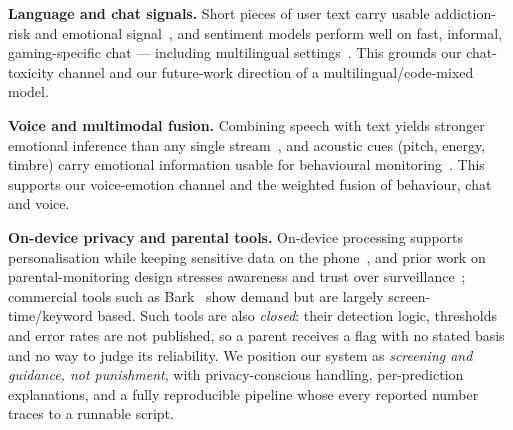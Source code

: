 \documentclass[11pt,a4paper]{article}
\begin{document}
\textbf{Language and chat signals.} Short pieces of user text carry usable
addiction-risk and emotional signal~\cite{strojny2024}, and sentiment models perform
well on fast, informal, gaming-specific chat --- including multilingual
settings~\cite{kina2024}. This grounds our chat-toxicity channel and our future-work
direction of a multilingual/code-mixed model.

\textbf{Voice and multimodal fusion.} Combining speech with text yields stronger
emotional inference than any single stream~\cite{tyagi2024}, and acoustic cues (pitch,
energy, timbre) carry emotional information usable for behavioural
monitoring~\cite{schuller2013}. This supports our voice-emotion channel and the weighted
fusion of behaviour, chat and voice.

\textbf{On-device privacy and parental tools.} On-device processing supports
personalisation while keeping sensitive data on the phone~\cite{chakraborty2025}, and
prior work on parental-monitoring design stresses awareness and trust over
surveillance~\cite{iftikhar2021}; commercial tools such as Bark~\cite{bark2025} show
demand but are largely screen-time/keyword based. Such tools are also \emph{closed}:
their detection logic, thresholds and error rates are not published, so a parent
receives a flag with no stated basis and no way to judge its reliability. We position
our system as \emph{screening and guidance, not punishment}, with privacy-conscious
handling, per-prediction explanations, and a fully reproducible pipeline whose every
reported number traces to a runnable script.
\end{document}
